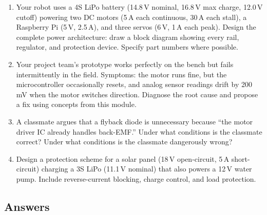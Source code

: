 \begin{enumerate}[resume,leftmargin=1.5em]
  \item Your robot uses a 4S LiPo battery (14.8\,V nominal, 16.8\,V max charge, 12.0\,V cutoff) powering two DC motors (5\,A each continuous, 30\,A each stall), a Raspberry Pi (5\,V, 2.5\,A), and three servos (6\,V, 1\,A each peak). Design the complete power architecture: draw a block diagram showing every rail, regulator, and protection device. Specify part numbers where possible.

  \item Your project team's prototype works perfectly on the bench but fails intermittently in the field. Symptoms: the motor runs fine, but the microcontroller occasionally resets, and analog sensor readings drift by 200\,mV when the motor switches direction. Diagnose the root cause and propose a fix using concepts from this module.

  \item A classmate argues that a flyback diode is unnecessary because ``the motor driver IC already handles back-EMF.'' Under what conditions is the classmate correct? Under what conditions is the classmate dangerously wrong?

  \item Design a protection scheme for a solar panel (18\,V open-circuit, 5\,A short-circuit) charging a 3S LiPo (11.1\,V nominal) that also powers a 12\,V water pump. Include reverse-current blocking, charge control, and load protection.
\end{enumerate}

\subsection{Answers}

